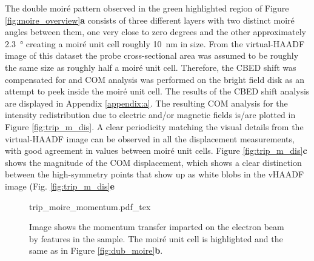 The double moiré pattern observed in the green highlighted region of Figure \ref{fig:moire_overview}\textbf{a} consists of three different layers with two distinct moiré angles between them, one very close to zero degrees and the other approximately \SI{2.3}{\degree} creating a moiré unit cell roughly \SI{10}{\nano\meter} in size. From the virtual-HAADF image of this dataset the probe cross-sectional area was assumed to be roughly the same size as roughly half a moiré unit cell. Therefore, the CBED shift was compensated for and COM analysis was performed on the bright field disk as an attempt to peek inside the moiré unit cell. The results of the CBED shift analysis are displayed in Appendix \ref{appendix:a}.
The resulting COM analysis for the intensity redistribution due to electric and/or magnetic fields is/are plotted in Figure \ref{fig:trip_m_dis}. A clear periodicity matching the visual details from the virtual-HAADF image can be observed in all the displacement measurements, with good agreement in values between moiré unit cells. Figure \ref{fig:trip_m_dis}\textbf{c} shows the magnitude of the COM displacement, which shows a clear distinction between the high-symmetry points that show up as white blobs in the vHAADF image (Fig. \ref{fig:trip_m_dis}\textbf{e}


\begin{figure}
    \centering
    \def\svgwidth{.7\linewidth}
    {trip_moire_momentum.pdf_tex}
    \caption{Image shows the momentum transfer imparted on the electron beam by features in the sample. The moiré unit cell is highlighted and the same as in Figure \ref{fig:dub_moire}\textbf{b}.}
    \label{fig:trip_m_mom}
\end{figure}

